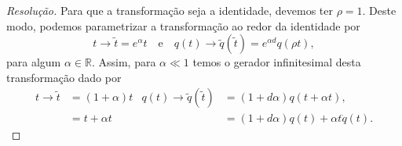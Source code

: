 \begin{proof}[Resolução]
    Para que a transformação seja a identidade, devemos ter \(\rho = 1\). Deste modo, podemos parametrizar a transformação ao redor da identidade por
    \begin{equation*}
        t \to \tilde{t} = e^\alpha t\quad\text{e}\quad q(t) \to \tilde{q}(\tilde{t}) = e^{\alpha d} q(\rho t),
    \end{equation*}
    para algum \(\alpha \in \mathbb{R}\). Assim, para \(\alpha \ll 1\) temos o gerador infinitesimal desta transformação dado por
    \begin{align*}
        t \to \tilde{t} &= (1 + \alpha)t& q(t) \to \tilde{q}(\tilde{t}) &= (1+d\alpha)q(t + \alpha t),\\
                        &= t + \alpha t& &=(1+d \alpha)q(t) + \alpha t \dot{q}(t).
    \end{align*}


\end{proof}
